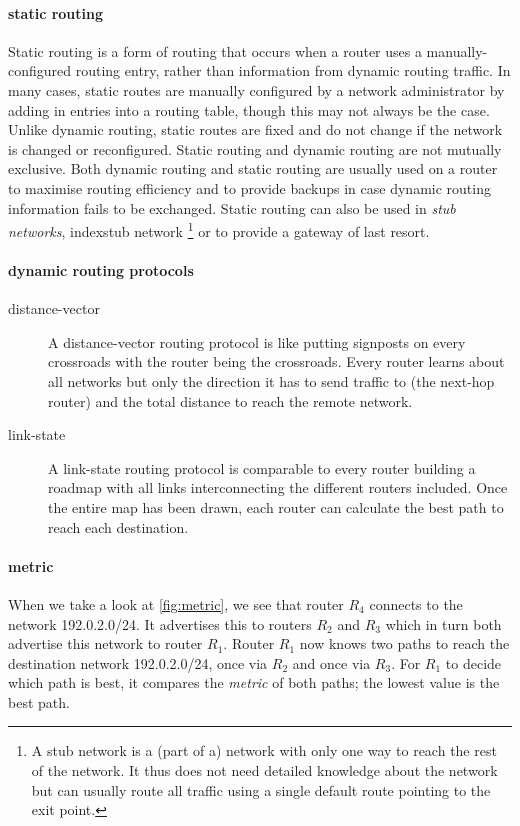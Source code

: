 \paragraph{static routing}
Static routing is a form of routing that occurs when a router uses a manually-configured routing entry, rather than information from dynamic routing traffic.
In many cases, static routes are manually configured by a network administrator by adding in entries into a routing table, though this may not always be the case.
Unlike dynamic routing, static routes are fixed and do not change if the network is changed or reconfigured.
Static routing and dynamic routing are not mutually exclusive.
Both dynamic routing and static routing are usually used on a router to maximise routing efficiency and to provide backups in case dynamic routing information fails to be exchanged.
Static routing can also be used in \emph{stub networks},%
index{stub network}%
\footnote{%
A stub network is a (part of a) network with only one way to reach the rest of the network.
It thus does not need detailed knowledge about the network but can usually route all traffic using a single default route pointing to the exit point.
}
or to provide a gateway of last resort.


\paragraph{dynamic routing protocols}
\begin{description}
\item[distance-vector]
A distance-vector routing protocol is like putting signposts on every crossroads with the router being the crossroads.
Every router learns about all networks but only the direction it has to send traffic to (the next-hop router) and the total distance to reach the remote network.
\item[link-state]
A link-state routing protocol is comparable to every router building a roadmap with all links interconnecting the different routers included.
Once the entire map has been drawn, each router can calculate the best path to reach each destination.
\end{description}

\paragraph{metric}
When we take a look at \vref{fig:metric}, we see that router $R_4$ connects to the network 192.0.2.0/24.
It advertises this to routers $R_2$ and $R_3$ which in turn both advertise this network to router $R_1$.
Router $R_1$ now knows two paths to reach the destination network 192.0.2.0/24, once via $R_2$ and once via $R_3$.
For $R_1$ to decide which path is best, it compares the \emph{metric} of both paths; the lowest value is the best path.

